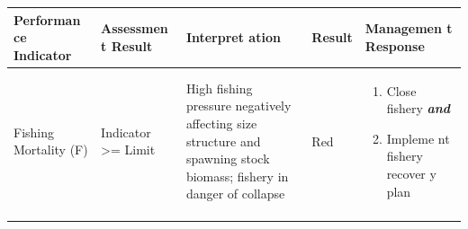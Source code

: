 \documentclass[]{book}
\begin{document}
\begin{longtable}[]{@{}lllll@{}}
\toprule
\begin{minipage}[b]{0.17\columnwidth}\raggedright\strut
\textbf{Performan ce Indicator}\strut
\end{minipage} & \begin{minipage}[b]{0.17\columnwidth}\raggedright\strut
\textbf{Assessmen t Result}\strut
\end{minipage} & \begin{minipage}[b]{0.17\columnwidth}\raggedright\strut
\textbf{Interpret ation}\strut
\end{minipage} & \begin{minipage}[b]{0.17\columnwidth}\raggedright\strut
\textbf{Result}\strut
\end{minipage} & \begin{minipage}[b]{0.17\columnwidth}\raggedright\strut
\textbf{Managemen t Response}\strut
\end{minipage}\tabularnewline
\midrule
\endhead
\begin{minipage}[t]{0.19\columnwidth}\raggedright\strut
Fishing Mortality (F)\strut
\end{minipage} & \begin{minipage}[t]{0.19\columnwidth}\raggedright\strut
Indicator \textgreater{}= Limit\strut
\end{minipage} & \begin{minipage}[t]{0.19\columnwidth}\raggedright\strut
High fishing pressure negatively affecting size structure and spawning
stock biomass; fishery in danger of collapse\strut
\end{minipage} & \begin{minipage}[t]{0.19\columnwidth}\raggedright\strut
Red\strut
\end{minipage} & \begin{minipage}[t]{0.19\columnwidth}\raggedright\strut
\begin{enumerate}
\def\labelenumi{\arabic{enumi}.}
\item
  Close fishery \textbf{\emph{and} }
\item
  Impleme nt fishery recover y plan
\end{enumerate}\strut
\end{minipage}\tabularnewline
\begin{minipage}[t]{0.19\columnwidth}\raggedright\strut
\strut
\end{minipage} & \begin{minipage}[t]{0.19\columnwidth}\raggedright\strut
\strut
\end{minipage} & \begin{minipage}[t]{0.19\columnwidth}\raggedright\strut

\end{minipage}
\end{longtable}
\end{document}

